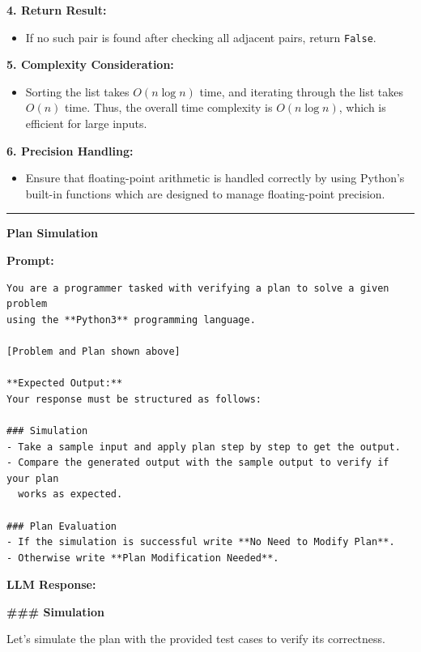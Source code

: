 \documentclass[11pt]{article}
\begin{document}
\begin{tcolorbox}[breakable, colback=white, colframe=black!70, boxrule=0.5pt, arc=2pt, left=4mm, right=4mm, top=3mm, bottom=3mm]
\textbf{4. Return Result:}
\begin{itemize}
    \item If no such pair is found after checking all adjacent pairs, return \texttt{False}.
\end{itemize}

\textbf{5. Complexity Consideration:}
\begin{itemize}
    \item Sorting the list takes $O(n \log n)$ time, and iterating through the list takes $O(n)$ time. Thus, the overall time complexity is $O(n \log n)$, which is efficient for large inputs.
\end{itemize}

\textbf{6. Precision Handling:}
\begin{itemize}
    \item Ensure that floating-point arithmetic is handled correctly by using Python's built-in functions which are designed to manage floating-point precision.
\end{itemize}

\vspace{0.5cm} \hrule \vspace{0.5cm}

\noindent\textbf{\Large Plan Simulation}

\textbf{Prompt:}
\begin{verbatim}
You are a programmer tasked with verifying a plan to solve a given problem 
using the **Python3** programming language.

[Problem and Plan shown above]

**Expected Output:**
Your response must be structured as follows:

### Simulation
- Take a sample input and apply plan step by step to get the output.
- Compare the generated output with the sample output to verify if your plan 
  works as expected.

### Plan Evaluation
- If the simulation is successful write **No Need to Modify Plan**.
- Otherwise write **Plan Modification Needed**.
\end{verbatim}

\textbf{LLM Response:}

\textbf{\#\#\# Simulation}

Let's simulate the plan with the provided test cases to verify its correctness.


\end{tcolorbox}
\end{document}
